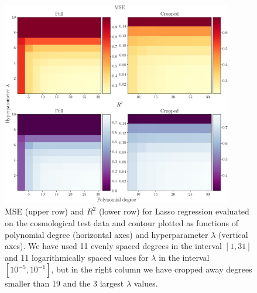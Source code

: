 \documentclass[aps,pra,english,notitlepage,reprint,nofootinbib]{revtex4-1}  %
\begin{document}
\begin{figure}
  \vspace*{-5pt}
  \centering %
  \includegraphics[width=0.9\textwidth]{../figs/g_MSE_R2_Lasso.pdf}
  \caption{MSE (upper row) and $R^2$ (lower row) for Lasso regression evaluated on the cosmological test data and contour plotted as functions of polynomial degree (horizontal axes) and hyperparameter $\lambda$ (vertical axes). We have used 11 evenly spaced degrees in the interval $[1, 31]$ and 11 logarithmically spaced values for $\lambda$ in the interval $[10^{-5},10^{-1}]$, but in the right column we have cropped away degrees smaller than 19 and the 3 largest $\lambda$ values.}\label{appfig:g MSE R2 Lasso}
  \vspace*{-5pt}
\end{figure}
\end{document}
